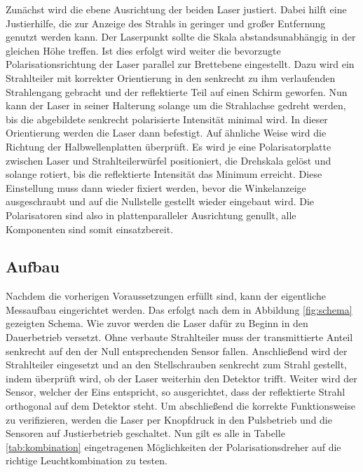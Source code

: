 Zunächst wird die ebene Ausrichtung der beiden Laser justiert. Dabei hilft eine Justierhilfe, die zur Anzeige des Strahls in geringer
und großer Entfernung genutzt werden kann. Der Laserpunkt sollte die Skala abstandsunabhängig in der gleichen Höhe treffen. Ist dies
erfolgt wird weiter die bevorzugte Polarisationsrichtung der Laser parallel zur Brettebene eingestellt. Dazu wird ein Strahlteiler mit
korrekter Orientierung in den senkrecht zu ihm verlaufenden Strahlengang gebracht und der reflektierte Teil auf einen Schirm geworfen.
Nun kann der Laser in seiner Halterung solange um die Strahlachse gedreht werden, bis die abgebildete senkrecht polarisierte Intensität 
minimal wird. In dieser Orientierung werden die Laser dann befestigt. Auf ähnliche Weise wird die Richtung der Halbwellenplatten
überprüft. Es wird je eine Polarisatorplatte zwischen Laser und Strahlteilerwürfel positioniert, die Drehskala gelöst und solange
rotiert, bis die reflektierte Intensität das Minimum erreicht. Diese Einstellung muss dann wieder fixiert werden, bevor die
Winkelanzeige ausgeschraubt und auf die Nullstelle gestellt wieder eingebaut wird. Die Polarisatoren sind also in plattenparalleler
Ausrichtung genullt, alle Komponenten sind somit einsatzbereit.



\subsection{Aufbau}
\label{sec:Aufbau}

Nachdem die vorherigen Voraussetzungen erfüllt sind, kann der eigentliche Messaufbau eingerichtet werden. Das erfolgt nach dem in
Abbildung \ref{fig:schema} gezeigten Schema. Wie zuvor werden die Laser dafür zu Beginn in den Dauerbetrieb versetzt. Ohne verbaute
Strahlteiler muss der transmittierte Anteil senkrecht auf den der Null entsprechenden Sensor fallen. Anschließend wird der Strahlteiler
eingesetzt und an den Stellschrauben senkrecht zum Strahl gestellt, indem überprüft wird, ob der Laser weiterhin den Detektor trifft.
Weiter wird der Sensor, welcher der Eins entspricht, so ausgerichtet, dass der reflektierte Strahl orthogonal auf dem Detektor steht.
Um abschließend die korrekte Funktionsweise zu verifizieren, werden die Laser per Knopfdruck in den Pulsbetrieb und die Sensoren auf
Justierbetrieb geschaltet. Nun gilt es alle in Tabelle \ref{tab:kombination} eingetragenen Möglichkeiten der Polarisationsdreher auf
die richtige Leuchtkombination zu testen.

